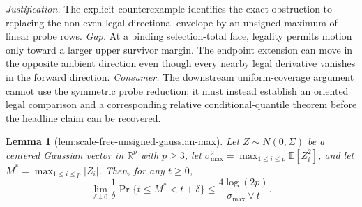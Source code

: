 \documentclass{article}
\newtheorem{lemma}{Lemma}
\begin{document}
\par\smallskip\noindent \textit{Justification.} The explicit counterexample identifies the exact obstruction to replacing the non-even legal directional envelope by an unsigned maximum of linear probe rows. \textit{Gap.} At a binding selection-total face, legality permits motion only toward a larger upper survivor margin.  The endpoint extension can move in the opposite ambient direction even though every nearby legal derivative vanishes in the forward direction. \textit{Consumer.} The downstream uniform-coverage argument cannot use the symmetric probe reduction; it must instead establish an oriented legal comparison and a corresponding relative conditional-quantile theorem before the headline claim can be recovered.

\begin{lemma}[lem:scale-free-unsigned-gaussian-max]\label{lem:scale-free-unsigned-gaussian-max}
Let \(Z\sim N(0,\Sigma)\) be a centered Gaussian vector in \(\mathbb R^p\) with \(p\ge3\), let \(\sigma_{\max}^2=\max_{1\le i\le p}\mathbb E[Z_i^2]\), and let \(M^*=\max_{1\le i\le p}|Z_i|\).  Then, for any \(t\ge0\),
\[
 \lim_{\delta\downarrow0}\frac{1}{\delta}
 \Pr\{t\le M^*<t+\delta\}
 \le \frac{4\log(2p)}{\sigma_{\max}\vee t}.
\]
\end{lemma}
\end{document}
